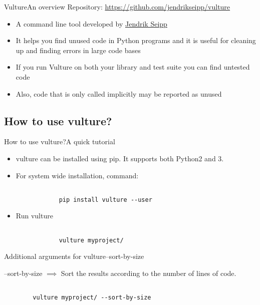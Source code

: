 \documentclass{beamer}
\begin{document}
\begin{frame}{Vulture}{An overview}
Repository: \url{https://github.com/jendrikseipp/vulture}

\begin{itemize}
    \item
    A command line tool developed by \href{https://github.com/jendrikseipp}{Jendrik Seipp}
    \pause
    \item
    It helps you find unused code in Python programs and it is useful for 
    cleaning up and finding errors in large code bases
    \pause
    \item
    If you run Vulture on both your library and test suite you can find untested code
    \pause
    \item
    Also, code that is only called implicitly may be reported as unused
\end{itemize}
\end{frame}

\subsection{How to use vulture?}

\begin{frame}{How to use vulture?}{A quick tutorial}

\begin{itemize}
    \item{
        vulture can be installed using pip. It supports both Python2 and 3.
    }
    \item{
        For system wide installation, command:
        \begin{verbatim}

            pip install vulture --user

        \end{verbatim}
    }
    \item{
        Run vulture
        \begin{verbatim}

            vulture myproject/

        \end{verbatim}
    }
\end{itemize}
\end{frame}

\begin{frame}{Additional arguments for vulture}{--sort-by-size}

--sort-by-size \begin{math} \implies \end{math} Sort the results according to the number of lines of code.

\begin{example}
    \begin{verbatim}

        vulture myproject/ --sort-by-size

    \end{verbatim}

\end{example}
\end{frame}
\end{document}
